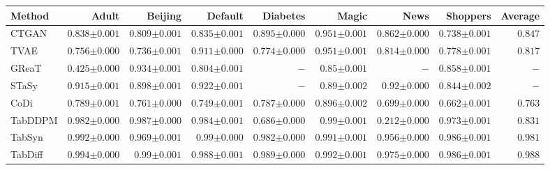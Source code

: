 \begin{tabular}{lrrrrrrr|r}
    \toprule[0.8pt]
     \textbf{Method} & \textbf{Adult} & \textbf{Beijing} & \textbf{Default} & \textbf{Diabetes} & \textbf{Magic} & \textbf{News} & \textbf{Shoppers} & \textbf{Average} \\
    \midrule 
    CTGAN & $0.838${\tiny${\pm 0.001}$} & $0.809${\tiny${\pm 0.001}$} & $0.835${\tiny${\pm 0.001}$} & $0.895${\tiny${\pm 0.000}$} & $0.951${\tiny${\pm 0.001}$} & $0.862${\tiny${\pm 0.000}$} & $0.738${\tiny${\pm 0.001}$} & $0.847$ \\
    TVAE & $0.756${\tiny${\pm 0.000}$} & $0.736${\tiny${\pm 0.001}$} & $0.911${\tiny${\pm 0.000}$} & $0.774${\tiny${\pm 0.000}$} & $0.951${\tiny${\pm 0.001}$} & $0.814${\tiny${\pm 0.000}$} & $0.778${\tiny${\pm 0.001}$} & $0.817$ \\
    GReaT & $0.425${\tiny${\pm 0.000}$} & $0.934${\tiny${\pm 0.001}$} & $0.804${\tiny${\pm 0.001}$} & $-$ & $0.85${\tiny${\pm 0.001}$} & $-$ & $0.858${\tiny${\pm 0.001}$} & $-$ \\
    STaSy & $0.915${\tiny${\pm 0.001}$} & $0.898${\tiny${\pm 0.001}$} & $0.922${\tiny${\pm 0.001}$} & $-$ & $0.89${\tiny${\pm 0.002}$} & $0.92${\tiny${\pm 0.000}$} & $0.844${\tiny${\pm 0.002}$} & $-$ \\
    CoDi & $0.789${\tiny${\pm 0.001}$} & $0.761${\tiny${\pm 0.000}$} & $0.749${\tiny${\pm 0.001}$} & $0.787${\tiny${\pm 0.000}$} & $0.896${\tiny${\pm 0.002}$} & $0.699${\tiny${\pm 0.000}$} & $0.662${\tiny${\pm 0.001}$} & $0.763$ \\
    TabDDPM & $0.982${\tiny${\pm 0.000}$} & $0.987${\tiny${\pm 0.000}$} & $0.984${\tiny${\pm 0.001}$} & $0.686${\tiny${\pm 0.000}$} & $0.99${\tiny${\pm 0.001}$} & $0.212${\tiny${\pm 0.000}$} & $0.973${\tiny${\pm 0.001}$} & $0.831$ \\    
    TabSyn & $0.992${\tiny${\pm 0.000}$} & $0.969${\tiny${\pm 0.001}$} & $0.99${\tiny${\pm 0.000}$} & $0.982${\tiny${\pm 0.000}$} & $0.991${\tiny${\pm 0.001}$} & $0.956${\tiny${\pm 0.000}$} & $0.986${\tiny${\pm 0.001}$} & $0.981$ \\
    TabDiff & $0.994${\tiny${\pm 0.000}$} & $0.99${\tiny${\pm 0.001}$} & $0.988${\tiny${\pm 0.001}$} & $0.989${\tiny${\pm 0.000}$} & $0.992${\tiny${\pm 0.001}$} & $0.975${\tiny${\pm 0.000}$} & $0.986${\tiny${\pm 0.001}$} & $0.988$ \\

\end{tabular}
